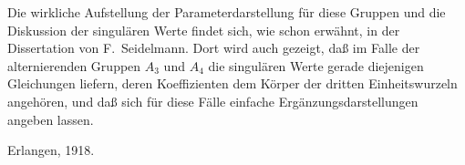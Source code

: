 \documentclass[12pt,a4paper]{article}
\begin{document}
Die wirkliche Aufstellung der Parameterdarstellung f\"ur diese Gruppen und die Diskussion der singul\"aren Werte findet sich, wie schon erw\"ahnt, in der Dissertation von F.\ Seidelmann. Dort wird auch gezeigt, da\ss{} im Falle der alternierenden Gruppen $A_3$ und $A_4$ die singul\"aren Werte gerade diejenigen Gleichungen liefern, deren Koeffizienten dem K\"orper der dritten Einheitswurzeln angeh\"oren, und da\ss{} sich f\"ur diese F\"alle einfache Erg\"anzungsdarstellungen angeben lassen.

\vspace{2em}
\begin{flushright}
Erlangen, 1918.
\end{flushright}
\end{document}
